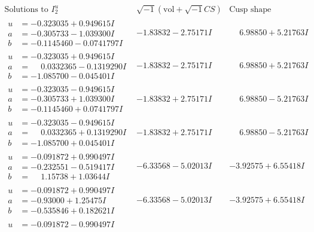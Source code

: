 \documentclass[1p]{elsarticle_modified}
\theoremstyle{definition}
\newcommand{\I}{\sqrt{-1}}
\begin{document}
$$\begin{array}{c|c|c}  
\text{Solutions to }I^u_{2}& \I (\text{vol} + \sqrt{-1}CS) & \text{Cusp shape}\\
 \hline 
\begin{aligned}
u &= -0.323035 + 0.949615 I \\
a &= -0.305733 - 1.039300 I \\
b &= -0.1145460 - 0.0741797 I\end{aligned}
 & -1.83832 - 2.75171 I & \phantom{-}6.98850 + 5.21763 I \\ \hline\begin{aligned}
u &= -0.323035 + 0.949615 I \\
a &= \phantom{-}0.0332365 - 0.1319290 I \\
b &= -1.085700 - 0.045401 I\end{aligned}
 & -1.83832 - 2.75171 I & \phantom{-}6.98850 + 5.21763 I \\ \hline\begin{aligned}
u &= -0.323035 - 0.949615 I \\
a &= -0.305733 + 1.039300 I \\
b &= -0.1145460 + 0.0741797 I\end{aligned}
 & -1.83832 + 2.75171 I & \phantom{-}6.98850 - 5.21763 I \\ \hline\begin{aligned}
u &= -0.323035 - 0.949615 I \\
a &= \phantom{-}0.0332365 + 0.1319290 I \\
b &= -1.085700 + 0.045401 I\end{aligned}
 & -1.83832 + 2.75171 I & \phantom{-}6.98850 - 5.21763 I \\ \hline\begin{aligned}
u &= -0.091872 + 0.990497 I \\
a &= -0.232551 - 0.519417 I \\
b &= \phantom{-}1.15738 + 1.03644 I\end{aligned}
 & -6.33568 - 5.02013 I & -3.92575 + 6.55418 I \\ \hline\begin{aligned}
u &= -0.091872 + 0.990497 I \\
a &= -0.93000 + 1.25475 I \\
b &= -0.535846 + 0.182621 I\end{aligned}
 & -6.33568 - 5.02013 I & -3.92575 + 6.55418 I \\ \hline\begin{aligned}
u &= -0.091872 - 0.990497 I \\

\end{aligned}
\end{array}$$
\end{document}
